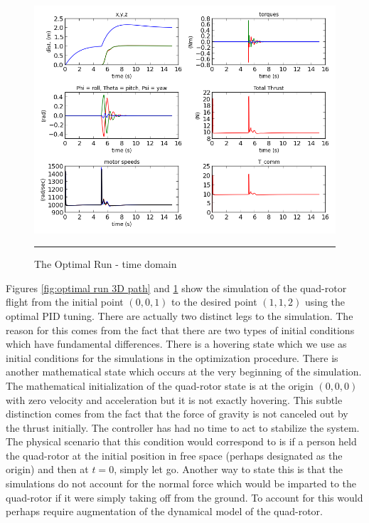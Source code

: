 \begin{figure}[htbp]
	\centering
		\includegraphics[width=\textwidth]{Figures/optimal_run_time_domain.png}
		\rule{35em}{0.5pt}
	\caption[Optimal Run Time Domain]{The Optimal Run - time domain}
	\label{fig:optimal run time domain}
\end{figure}



Figures \ref{fig:optimal run 3D path} and \ref{fig:optimal run time domain} show the simulation of the quad-rotor flight from the initial point $(0,0,1)$ to the desired point $(1,1,2)$ using the optimal PID tuning. There are actually two distinct legs to the simulation. The reason for this comes from the fact that there are two types of initial conditions which have fundamental differences. There is a hovering state which we use as initial conditions for the simulations in the optimization procedure. There is another mathematical state which occurs at the very beginning of the simulation. The mathematical initialization of the quad-rotor state is at the origin $(0,0,0)$ with zero velocity and acceleration but it is not exactly hovering. This subtle distinction comes from the fact that the force of gravity is not canceled out by the thrust initially. The controller has had no time to act to stabilize the system. The physical scenario that this condition would correspond to is if a person held the quad-rotor at the initial position in free space (perhaps designated as the origin) and then at $t=0$, simply let go. Another way to state this is that the simulations do not account for the normal force which would be imparted to the quad-rotor if it were simply taking off from the ground. To account for this would perhaps require augmentation of the dynamical model of the quad-rotor.

